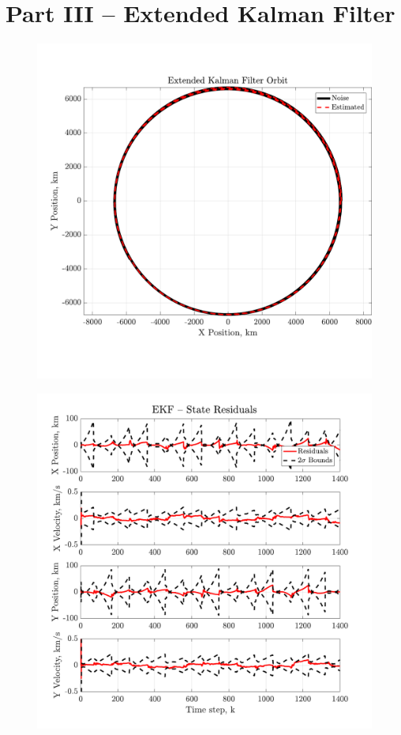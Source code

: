 \documentclass[a4paper]{aiaa-tc}
\begin{document}
 \section*{Part III -- Extended Kalman Filter}
  \begin{figure}[H]
 \centering
 \includegraphics[width=\textwidth]{Figures/EKF_orbit.pdf}
 \end{figure}
 
  \begin{figure}[H]
 \centering
 \includegraphics[width=\textwidth]{Figures/EKF_residuals.pdf}
 \end{figure}
 
\end{document}
